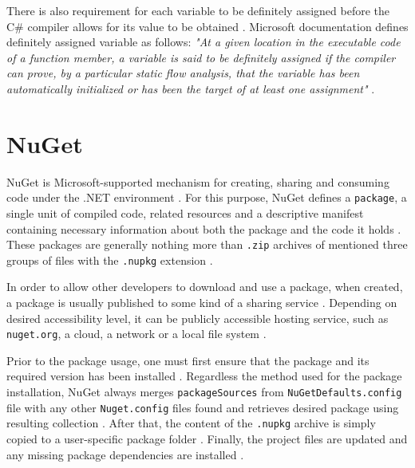 There is also requirement for each variable to be definitely assigned before the C\# compiler allows for its value to be obtained \citep{microsoft.docs}. Microsoft documentation defines definitely assigned variable as follows: \textit{"At a given location in the executable code of a function member, a variable is said to be definitely assigned if the compiler can prove, by a particular static flow analysis, that the variable has been automatically initialized or has been the target of at least one assignment"} \citep{microsoft.docs}. 


\section{NuGet}
NuGet is Microsoft-supported mechanism for creating, sharing and consuming code under the .NET environment \citep{microsoft.docs}. For this purpose, NuGet defines a \texttt{package}, a single unit of compiled code, related resources and a descriptive manifest containing necessary information about both the package and the code it holds \citep{microsoft.docs}. These packages are generally nothing more than \texttt{.zip} archives of mentioned three groups of files with the \texttt{.nupkg} extension \citep{microsoft.docs}. 

In order to allow other developers to download and use a package, when created, a package is usually published to some kind of a sharing service \citep{microsoft.docs}. Depending on desired accessibility level, it can be publicly accessible hosting service, such as \texttt{nuget.org}, a cloud, a network or a local file system \citep{microsoft.docs}.

Prior to the package usage, one must first ensure that the package and its required version has been installed \citep{microsoft.docs}. Regardless the method used for the package installation, NuGet always merges \texttt{packageSources} from \texttt{NuGetDefaults.config} file with any other \texttt{Nuget.config} files found and retrieves desired package using resulting collection \citep{microsoft.docs}. After that, the content of the \texttt{.nupkg} archive is simply copied to a user-specific package folder \citep{microsoft.docs}. Finally, the project files are updated and any missing package dependencies are installed \citep{microsoft.docs}. 




